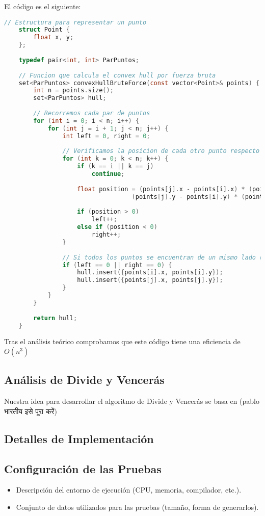 \documentclass[a4paper,12pt]{article}
\begin{document}
El código es el siguiente:

\begin{lstlisting}[language=C, caption={Brute Force de \textbf{"La envolvente convexa"}}]
	// Estructura para representar un punto
	struct Point {
		float x, y;
	};
	
	typedef pair<int, int> ParPuntos;
	
	// Funcion que calcula el convex hull por fuerza bruta
	set<ParPuntos> convexHullBruteForce(const vector<Point>& points) {
		int n = points.size();
		set<ParPuntos> hull;
		
		// Recorremos cada par de puntos
		for (int i = 0; i < n; i++) {
			for (int j = i + 1; j < n; j++) {
				int left = 0, right = 0;
				
				// Verificamos la posicion de cada otro punto respecto a la linea formada por points[i] y points[j]
				for (int k = 0; k < n; k++) {
					if (k == i || k == j)
						continue;
						
					float position = (points[j].x - points[i].x) * (points[k].y - points[i].y) -
								   (points[j].y - points[i].y) * (points[k].x - points[i].x);
					
					if (position > 0)
						left++;
					else if (position < 0)
						right++;
				}
				
				// Si todos los puntos se encuentran de un mismo lado (o son colineales), se adjuntan los puntos de la arista
				if (left == 0 || right == 0) {
					hull.insert({points[i].x, points[i].y});
					hull.insert({points[j].x, points[j].y});
				}
			}
		}
		
		return hull;
	}
\end{lstlisting}

Tras el análisis teórico comprobamos que este código tiene una eficiencia de $O(n^3)$

\subsection{Análisis de Divide y Vencerás}
Nuestra idea para desarrollar el algoritmo de Divide y Vencerás se basa en (pablo भारतीय इसे पूरा करें)
\subsection{Detalles de Implementación}

\subsection{Configuración de las Pruebas}
\begin{itemize}
	\item Descripción del entorno de ejecución (CPU, memoria, compilador, etc.).
	\item Conjunto de datos utilizados para las pruebas (tamaño, forma de generarlos).
\end{itemize}
\end{document}
